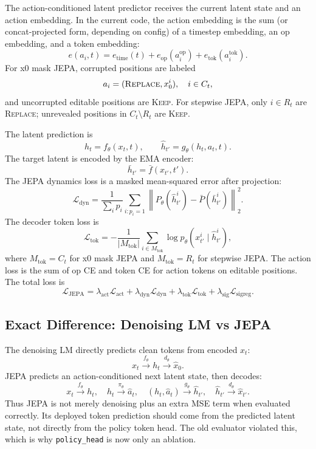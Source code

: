 \documentclass[11pt]{article}
\begin{document}
The action-conditioned latent predictor receives the current latent state and
an action embedding.  In the current code, the action embedding is the sum (or
concat-projected form, depending on config) of a timestep embedding, an op
embedding, and a token embedding:
\[
  e(a_i,t) =
  e_{\mathrm{time}}(t) +
  e_{\mathrm{op}}(a_i^{\mathrm{op}}) +
  e_{\mathrm{tok}}(a_i^{\mathrm{tok}}).
\]
For x0 mask JEPA, corrupted positions are labeled
\[
  a_i = (\textsc{Replace}, x_0^i), \quad i \in C_t,
\]
and uncorrupted editable positions are \textsc{Keep}.  For stepwise JEPA,
only $i\in R_t$ are \textsc{Replace}; unrevealed positions in $C_t\setminus R_t$
are \textsc{Keep}.

The latent prediction is
\[
  h_t = f_\theta(x_t,t), \qquad
  \hat h_{t'} = g_\theta(h_t,a_t,t).
\]
The target latent is encoded by the EMA encoder:
\[
  \bar h_{t'} = \bar f(x_{t'},t').
\]
The JEPA dynamics loss is a masked mean-squared error after projection:
\[
  \mathcal{L}_{\mathrm{dyn}} =
  \frac{1}{\sum_i p_i}
  \sum_{i:p_i=1}
  \left\|
    P_\theta(\hat h_{t'}^i) - \bar P(\bar h_{t'}^i)
  \right\|_2^2.
\]
The decoder token loss is
\[
  \mathcal{L}_{\mathrm{tok}} =
  -\frac{1}{|M_{\mathrm{tok}}|}
  \sum_{i\in M_{\mathrm{tok}}}
  \log p_\theta(x_{t'}^i \mid \hat h_{t'}^i),
\]
where $M_{\mathrm{tok}}=C_t$ for x0 mask JEPA and $M_{\mathrm{tok}}=R_t$ for
stepwise JEPA.  The action loss is the sum of op CE and token CE for action
tokens on editable positions.  The total loss is
\[
  \mathcal{L}_{\mathrm{JEPA}}
  =
  \lambda_{\mathrm{act}}\mathcal{L}_{\mathrm{act}}
  +
  \lambda_{\mathrm{dyn}}\mathcal{L}_{\mathrm{dyn}}
  +
  \lambda_{\mathrm{tok}}\mathcal{L}_{\mathrm{tok}}
  +
  \lambda_{\mathrm{sig}}\mathcal{L}_{\mathrm{sigreg}}.
\]

\subsection{Exact Difference: Denoising LM vs JEPA}

The denoising LM directly predicts clean tokens from encoded $x_t$:
\[
  x_t \xrightarrow{f_\theta} h_t \xrightarrow{d_\theta} \hat x_0.
\]
JEPA predicts an action-conditioned next latent state, then decodes:
\[
  x_t \xrightarrow{f_\theta} h_t,\quad
  h_t \xrightarrow{\pi_\theta} \hat a_t,\quad
  (h_t,\hat a_t) \xrightarrow{g_\theta} \hat h_{t'},\quad
  \hat h_{t'} \xrightarrow{d_\theta} \hat x_{t'}.
\]
Thus JEPA is not merely denoising plus an extra MSE term when evaluated
correctly.  Its deployed token prediction should come from the predicted latent
state, not directly from the policy token head.  The old evaluator violated
this, which is why \texttt{policy\_head} is now only an ablation.
\end{document}

